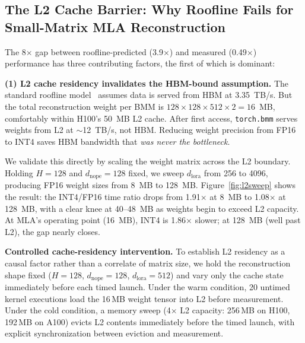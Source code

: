 \documentclass[10pt,twocolumn]{article}
\begin{document}
\subsection{The L2 Cache Barrier: Why Roofline Fails for Small-Matrix MLA Reconstruction}
\label{sec:l2barrier}

The 8$\times$ gap between roofline-predicted (3.9$\times$) and measured (0.49$\times$) performance has three contributing factors, the first of which is dominant:

\textbf{(1) L2 cache residency invalidates the HBM-bound assumption.}  The standard roofline model~\cite{roofline} assumes data is served from HBM at 3.35~TB/s.  But the total reconstruction weight per BMM is $128 \times 128 \times 512 \times 2 = 16$~MB, comfortably within H100's 50~MB L2 cache.  After first access, \texttt{torch.bmm} serves weights from L2 at $\sim$12~TB/s, not HBM.  Reducing weight precision from FP16 to INT4 saves HBM bandwidth that \emph{was never the bottleneck}.

We validate this directly by scaling the weight matrix across the L2 boundary.  Holding $H{=}128$ and $d_\text{nope}{=}128$ fixed, we sweep $d_\text{lora}$ from 256 to 4096, producing FP16 weight sizes from 8~MB to 128~MB.  Figure~\ref{fig:l2sweep} shows the result: the INT4/FP16 time ratio drops from 1.91$\times$ at 8~MB to 1.08$\times$ at 128~MB, with a clear knee at 40--48~MB as weights begin to exceed L2 capacity.  At MLA's operating point (16~MB), INT4 is 1.86$\times$ slower; at 128~MB (well past L2), the gap nearly closes.

\textbf{Controlled cache-residency intervention.}  To establish L2 residency as a causal factor rather than a correlate of matrix size, we hold the reconstruction shape fixed ($H{=}128$, $d_\text{nope}{=}128$, $d_\text{lora}{=}512$) and vary only the cache state immediately before each timed launch.  Under the warm condition, 20 untimed kernel executions load the 16\,MB weight tensor into L2 before measurement.  Under the cold condition, a memory sweep (4$\times$ L2 capacity: 256\,MB on H100, 192\,MB on A100) evicts L2 contents immediately before the timed launch, with explicit synchronization between eviction and measurement.
\end{document}
